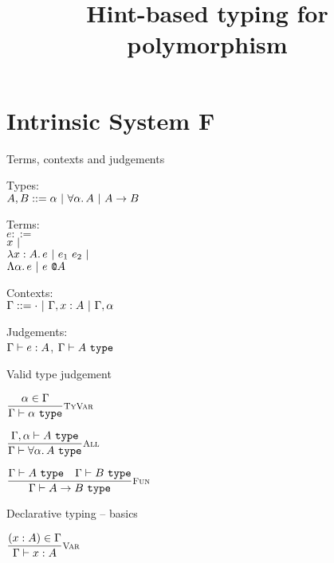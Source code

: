 \documentclass{beamer}
\title{Hint-based typing for polymorphism}
\begin{document}
\frame{\titlepage}

\section{Intrinsic System F}

\begin{frame}{Terms, contexts and judgements}

Types: \\
$A, B ::= \alpha \pipe \ForallT{\alpha}{A} \pipe \Fun{A}{B}$

\vspace{1em}

Terms: \\
$e ::=$ \\
\qquad $x \pipe $ \\
\qquad $\ifun{x}{A}{e} \pipe \app{e_1}{e_2} \pipe$ \\
\qquad $\tfun{\alpha}{e} \pipe \tapp{e}{A}$

\vspace{1em}

Contexts: \\
$\Gamma ::= \emptytypingctx \pipe \extend{\Gamma}{x}{A} \pipe \extendtype{\Gamma}{\alpha}$

\vspace{1em}

Judgements: \\
$\typing{e}{A}$, $\type{A}$

\end{frame}

\begin{frame}{Valid type judgement}

\begin{center}
  $\infrule[TyVar]{\sidecond{\alpha \in \Gamma}}{\type{\alpha}}$

  \vspace{2em}

  $\infrule[All]{\fulltype{\extendtype{\Gamma}{\alpha}}{A}}{\type{\ForallT{\alpha}{A}}}$

  \vspace{2em}

  $\infrule[Fun]{\type{A} \quad \type{B}}{\type{\Fun{A}{B}}}$
\end{center}

\end{frame}

\begin{frame}{Declarative typing -- basics}

\begin{center}
  $\infrule[Var]{\sidecond{(x : A) \in \Gamma}}{\typing{x}{A}}$
\end{center}

\end{frame}
\end{document}
